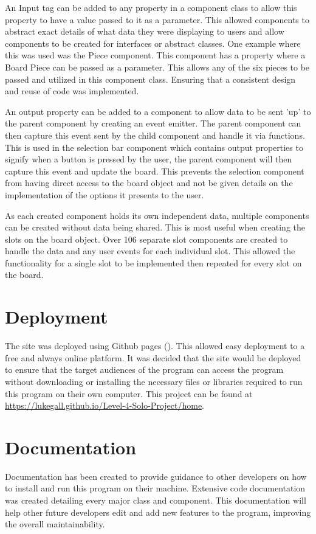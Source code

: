 \documentclass{l4proj}
\begin{document}
An Input tag can be added to any property in a component class to allow this property to have a value passed to it as a parameter. This allowed components to abstract exact details of what data they were displaying to users and allow components to be created for interfaces or abstract classes. One example where this was used was the Piece component. This component has a property where a Board Piece can be passed as a parameter. This allows any of the six pieces to be passed and utilized in this component class. Ensuring that a consistent design and reuse of code was implemented. 

An output property can be added to a component to allow data to be sent 'up' to the parent component by creating an event emitter. The parent component can then capture this event sent by the child component and handle it via functions. This is used in the selection bar component which contains output properties to signify when a button is pressed by the user, the parent component will then capture this event and update the board. This prevents the selection component from having direct access to the board object and not be given details on the implementation of the options it presents to the user. 

As each created component holds its own independent data, multiple components can be created without data being shared. This is most useful when creating the slots on the board object. Over 106 separate slot components are created to handle the data and any user events for each individual slot. This allowed the functionality for a single slot to be implemented then repeated for every slot on the board.


\section{Deployment}
The site was deployed using Github pages (\cite{github_pages}). This allowed easy deployment to a free and always online platform. It was decided that the site would be deployed to ensure that the target audiences of the program can access the program without downloading or installing the necessary files or libraries required to run this program on their own computer. This project can be found at \url{https://lukegall.github.io/Level-4-Solo-Project/home}.

\section{Documentation}
Documentation has been created to provide guidance to other developers on how to install and run this program on their machine. Extensive code documentation was created detailing every major class and component. This documentation will help other future developers edit and add new features to the program, improving the overall maintainability.
 
\end{document}
